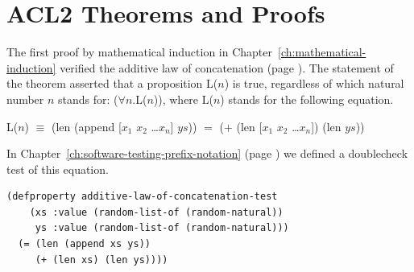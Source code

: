 \section{ACL2 Theorems and Proofs}
\label{sec:theorems-and-acl2-proofs}

The first proof by mathematical induction
in Chapter~\ref{ch:mathematical-induction}
verified the additive law of concatenation
(page \pageref{additive-law-concatenation}).
The statement of the theorem asserted that a proposition L($n$) is true,
regardless of which natural number $n$ stands for: ($\forall$$n$.L($n$)),
where L($n$) stands for the following equation.
\label{eq:Ln-additive-law}
\begin{center}
L($n$) $\equiv$ (len (append [$x_1$ $x_2$ \dots $x_n$] $ys$)) $=$ ($+$ (len [$x_1$ $x_2$ \dots $x_n$]) (len $ys$))
\end{center}

In Chapter~\ref{ch:software-testing-prefix-notation} (page \pageref{additive-lengths-test})
we defined a doublecheck test of this equation.

\begin{Verbatim}
(defproperty additive-law-of-concatenation-test
    (xs :value (random-list-of (random-natural))
     ys :value (random-list-of (random-natural)))
  (= (len (append xs ys))
     (+ (len xs) (len ys))))
\end{Verbatim}

